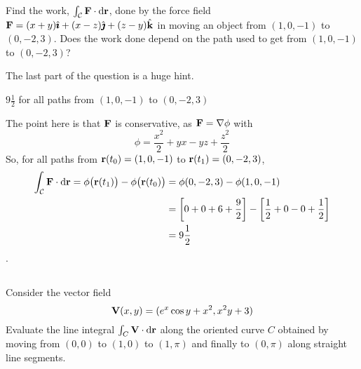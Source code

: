 \begin{question}
Find the work, $\int_{\mathcal{C}}\mathbf{F}\cdot \mathrm{d}\mathbf{r}$, done by the force field 
$\mathbf{F}=(x+y)\hat{\pmb{\imath}}+(x-z)\hat{\pmb{\jmath}}+(z-y)\hat{\mathbf{k}}$ in moving an object
from $(1,0,-1)$ to $(0,-2,3)$. Does the work done depend on the path used
to get from $(1,0,-1)$ to $(0,-2,3)$?
\end{question}

\begin{hint}
The last part of the question is a huge hint.
\end{hint}

\begin{answer}
$9\frac{1}{2}$ for all paths from $(1,0,-1)$ to $(0,-2,3)$
\end{answer}

\begin{solution}
The point here is that $\mathbf{F}$ is conservative, as
$\mathbf{F}=\nabla\phi$ with 
\begin{equation*}
\phi=\frac{x^2}{2}+yx-yz+\frac{z^2}{2}
\end{equation*}
So, for all paths from $\mathbf{r}(t_0)=(1,0,-1)$ to $\mathbf{r}(t_1)=(0,-2,3)$,
\begin{align*}
\int_{\mathcal{C}}\mathbf{F}\cdot \mathrm{d}\mathbf{r}
=\phi\big(\mathbf{r}(t_1)\big)-\phi\big(\mathbf{r}(t_0)\big)
&=\phi(0, -2, 3)-\phi(1,0,-1) \\
&=\left[0+0+6+\frac{9}{2}\right]-\left[\frac{1}{2}+0-0+\frac{1}{2}\right] \\
&=9\frac{1}{2}
\end{align*}
.

\end{solution}


\subsection*{\Procedural}

\begin{question}
Consider the vector field 
\begin{equation*}
\mathbf{V}(x, y) = (e^x \cos y + x^2, x^2y + 3)
\end{equation*}
Evaluate the line integral $\int_C\mathbf{V}\cdot \mathrm{d}\mathbf{r}$ along the 
oriented  curve $C$ obtained by moving from $(0, 0)$ to $(1,0)$ to 
$(1, \pi)$ and finally to $(0, \pi)$ along straight line segments. 
\end{question}


